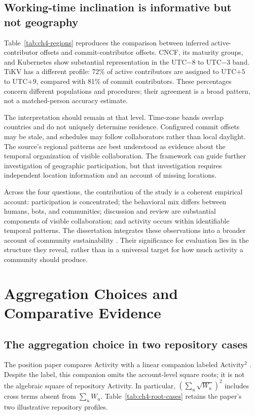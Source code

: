 \subsection{Working-time inclination is informative but not geography}
Table~\ref{tab:ch4-regions} reproduces the comparison between inferred active-contributor offsets and commit-contributor offsets. CNCF, its maturity groups, and Kubernetes show substantial representation in the UTC$-8$ to UTC$-3$ band. TiKV has a different profile: 72\% of active contributors are assigned to UTC$+5$ to UTC$+9$, compared with 81\% of commit contributors. These percentages concern different populations and procedures; their agreement is a broad pattern, not a matched-person accuracy estimate.



The interpretation should remain at that level. Time-zone bands overlap countries and do not uniquely determine residence. Configured commit offsets may be stale, and schedules may follow collaborators rather than local daylight. The source's regional patterns are best understood as evidence about the temporal organization of visible collaboration. The framework can guide further investigation of geographic participation, but that investigation requires independent location information and an account of missing locations.

Across the four questions, the contribution of the study is a coherent empirical account: participation is concentrated; the behavioral mix differs between humans, bots, and communities; discussion and review are substantial components of visible collaboration; and activity occurs within identifiable temporal patterns. The dissertation integrates these observations into a broader account of community sustainability \citep[Chapter 5]{xia2024thesis}. Their significance for evaluation lies in the structure they reveal, rather than in a universal target for how much activity a community should produce.

\section{Aggregation Choices and Comparative Evidence}
\label{sec:ch4-comparison}

\subsection{The aggregation choice in two repository cases}
The position paper compares Activity with a linear companion labeled Activity\(^{2}\) \citep[Sections 4.1--4.2]{han2024ose}. Despite the label, this companion omits the account-level square roots; it is not the algebraic square of repository Activity. In particular, \((\sum_u\sqrt{W_u})^2\) includes cross terms absent from \(\sum_u W_u\). Table~\ref{tab:ch4-root-cases} retains the paper's two illustrative repository profiles.

